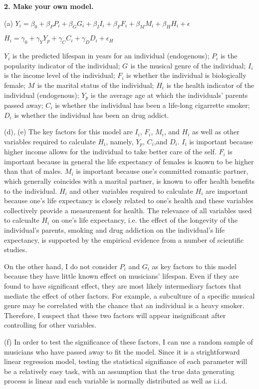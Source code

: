 \documentclass[letterpaper,12pt]{article}
\theoremstyle{definition}
\begin{document}
\noindent\textbf{2. Make your own model.}
\par
\noindent (a)
$Y_{i} = \beta_{0} + \beta_{P}P_{i} + \beta_{G}G_{i} + \beta_{I}I_{i} + \beta_{F}F_{i} + \beta_{M}M_{i} + \beta_{H}H_{i} + \epsilon$
\par
$H_{i} = \gamma_{0} + \gamma_{Y}Y_{p} + \gamma_{C}C_{i} + \gamma_{D}D_{i} + \epsilon_{H}$
\par\bigskip
$Y_{i}$ is the predicted lifespan in years for an individual (endogenous); 
$P_{i}$ is the popularity indicator of the individual;
$G_{}$ is the musical genre of the individual;
$I_{i}$ is the income level of the individual;
$F_{i}$ is whether the individual is biologically female;
$M_{}$ is the marital status of the individual;
$H_{i}$ is the health indicator of the individual (endogenous);
$Y_{p}$ is the average age at which the individuals' parents passed away;
$C_{i}$ is whether the individual has been a life-long cigarrette smoker;
$D_{i}$ is whether the individual has been an drug addict.
\par\bigskip
\noindent (d), (e) The key factors for this model are $I_{i}$, $F_{i}$, $M_{i}$, and $H_{i}$ as well as other variables required to calculate $H_{i}$, namely, $Y_{p}$, $C_{i}$,and $D_{i}$. $I_{i}$ is important because higher income allows for the individual to take better care of the self. $F_{i}$ is important because in general the life expectancy of females is known to be higher than that of males. $M_{i}$ is important because one's committed romantic partner, which generally coincides with a marital partner, is known to offer health benefits to the individual. $H_{i}$ and other variables required to calculate $H_{i}$ are important because one's life expectancy is closely related to one's health and these variables collectively provide a measurement for health. The relevance of all variables used to calcualte $H_{i}$ on one's life expectancy, i.e. the effect of the longevity of the individual's parents, smoking and drug addiction on the individual's life expectancy, is supported by the empirical evidence from a number of scientific studies.
\par
On the other hand, I do not consider $P_{i}$ and $G_{i}$ as key factors to this model because they have little known effect on musicians' lifespan. Even if they are found to have significant effect, they are most likely intermediary factors that mediate the effect of other factors. For example, a subculture of a specific musical genre may be correlated with the chance that an individual is a heavy smoker. Therefore, I suspect that these two factors will appear insignificant after controlling for other variables.
\par\bigskip
\noindent (f) In order to test the significance of these factors, I can use a random sample of musicians who have passed away to fit the model. Since it is a strightforward linear regression model, testing the statistical signifiance of each parameter will be a relatively easy task, with an assumption that the true data generating process is linear and each variable is normally distributed as well as i.i.d.
\par
\end{document}
